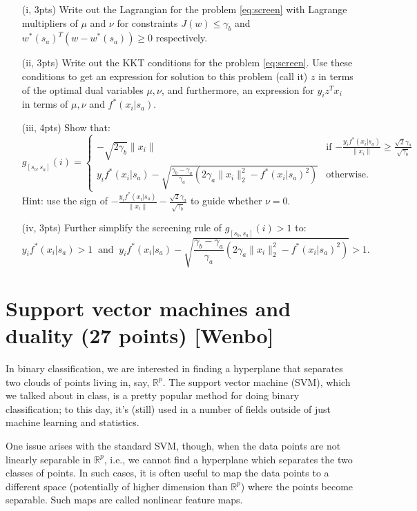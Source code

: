 \documentclass{article}
\theoremstyle{remark}
\theoremstyle{definition}
\newcommand{\reals}{\mathbb R}
\begin{document}
\begin{enumerate}[(i)]
\item[(i, 3pts)] Write out the Lagrangian for the problem \eqref{eq:screen} with
  Lagrange multipliers of $\mu$ and $\nu$ for constraints $J(w)\leq\gamma_b$ and 
  $w^*(s_a)^T(w-w^*(s_a))\geq 0$ respectively. 


\item[(ii, 3pts)] Write out the KKT conditions for the problem \eqref{eq:screen}. 
Use these conditions to get an expression for solution to this problem (call 
it) $z$ in terms of the optimal dual variables $\mu,\nu$, and furthermore, an 
expression for $y_i z^T x_i$ in terms of $\mu,\nu$ and $f^*(x_i|s_a)$.


\item[(iii, 4pts)] Show that:
$$
g_{[s_b,s_a]}(i) = \begin{cases} 
-\sqrt{2\gamma_b}\|x_{i}\| & 
\text{if $-\frac{y_i f^*(x_i|s_a)}{\|x_i\|}\geq
  \frac{\sqrt{2}\gamma_a}{\sqrt{\gamma_b}}$} \\ 
y_i f^*(x_i|s_a) -
\sqrt{\frac{\gamma_b-\gamma_a}{\gamma_a}
\left(2\gamma_a\|x_i\|_2^2-f^*(x_i|s_a)^2\right)} 
& \text{otherwise.} 
\end{cases}
$$
Hint: use the sign of $-\frac{y_i f^*(x_i|s_a)}{\|x_i\|} - \frac{\sqrt{2}\gamma_a}{\sqrt{\gamma_b}}$ to guide whether $\nu=0$. 


\item[(iv, 3pts)] Further simplify the screening rule of $g_{[s_b,s_a]}(i)>1$ to:
$$
y_i f^*(x_i|s_a) > 1 \;\; \text{and} \;\; y_i f^*(x_i|s_a) -
\sqrt{\frac{\gamma_b-\gamma_a}{\gamma_a}
\left(2\gamma_a\|x_i\|_2^2-f^*(x_i|s_a)^2\right)} > 1. 
$$

\end{enumerate}
\section{Support vector machines and duality (27 points) [Wenbo]}

In binary classification, we are interested in finding a hyperplane that separates two clouds of points living in, say, $\reals^p$.  The support vector machine (SVM), which we talked about in class, is a pretty popular method for doing binary classification; to this day, it's (still) used in a number of fields outside of just machine learning and statistics.

One issue arises with the standard SVM, though, when the data points are not linearly separable in $\reals^p$, i.e., we cannot find a hyperplane which separates the two classes of points. In such cases, it is often useful to map the data points to a different space (potentially of higher dimension than $\reals^p$) where the points become separable. Such maps are called nonlinear feature maps. 
\end{document}
